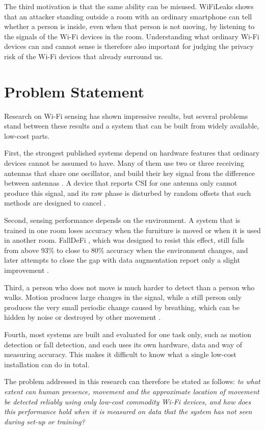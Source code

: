 The third motivation is that the same ability can be misused. WiFiLeaks \cite{wifileaks} shows that an attacker standing outside a room with an ordinary smartphone can tell whether a person is inside, even when that person is not moving, by listening to the signals of the Wi-Fi devices in the room. Understanding what ordinary Wi-Fi devices can and cannot sense is therefore also important for judging the privacy risk of the Wi-Fi devices that already surround us.

\section{Problem Statement}
Research on Wi-Fi sensing has shown impressive results, but several problems stand between these results and a system that can be built from widely available, low-cost parts.

First, the strongest published systems depend on hardware features that ordinary devices cannot be assumed to have. Many of them use two or three receiving antennas that share one oscillator, and build their key signal from the difference between antennas \cite{antifall,rtfall,wiborder,pads,thude}. A device that reports CSI for one antenna only cannot produce this signal, and its raw phase is disturbed by random offsets that such methods are designed to cancel \cite{wiborder}.

Second, sensing performance depends on the environment. A system that is trained in one room loses accuracy when the furniture is moved or when it is used in another room. FallDeFi \cite{falldefi}, which was designed to resist this effect, still falls from above 93\% to close to 80\% accuracy when the environment changes, and later attempts to close the gap with data augmentation report only a slight improvement \cite{adafall}.

Third, a person who does not move is much harder to detect than a person who walks. Motion produces large changes in the signal, while a still person only produces the very small periodic change caused by breathing, which can be hidden by noise or destroyed by other movement \cite{deman}.

Fourth, most systems are built and evaluated for one task only, such as motion detection or fall detection, and each uses its own hardware, data and way of measuring accuracy. This makes it difficult to know what a single low-cost installation can do in total.

The problem addressed in this research can therefore be stated as follows: \emph{to what extent can human presence, movement and the approximate location of movement be detected reliably using only low-cost commodity Wi-Fi devices, and how does this performance hold when it is measured on data that the system has not seen during set-up or training?}

